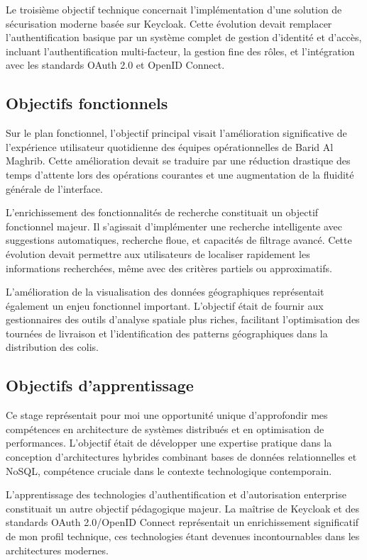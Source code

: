 Le troisième objectif technique concernait l'implémentation d'une solution de sécurisation moderne basée sur Keycloak. Cette évolution devait remplacer l'authentification basique par un système complet de gestion d'identité et d'accès, incluant l'authentification multi-facteur, la gestion fine des rôles, et l'intégration avec les standards OAuth 2.0 et OpenID Connect.

\subsection{Objectifs fonctionnels}

Sur le plan fonctionnel, l'objectif principal visait l'amélioration significative de l'expérience utilisateur quotidienne des équipes opérationnelles de Barid Al Maghrib. Cette amélioration devait se traduire par une réduction drastique des temps d'attente lors des opérations courantes et une augmentation de la fluidité générale de l'interface.

L'enrichissement des fonctionnalités de recherche constituait un objectif fonctionnel majeur. Il s'agissait d'implémenter une recherche intelligente avec suggestions automatiques, recherche floue, et capacités de filtrage avancé. Cette évolution devait permettre aux utilisateurs de localiser rapidement les informations recherchées, même avec des critères partiels ou approximatifs.

L'amélioration de la visualisation des données géographiques représentait également un enjeu fonctionnel important. L'objectif était de fournir aux gestionnaires des outils d'analyse spatiale plus riches, facilitant l'optimisation des tournées de livraison et l'identification des patterns géographiques dans la distribution des colis.

\subsection{Objectifs d'apprentissage}

Ce stage représentait pour moi une opportunité unique d'approfondir mes compétences en architecture de systèmes distribués et en optimisation de performances. L'objectif était de développer une expertise pratique dans la conception d'architectures hybrides combinant bases de données relationnelles et NoSQL, compétence cruciale dans le contexte technologique contemporain.

L'apprentissage des technologies d'authentification et d'autorisation enterprise constituait un autre objectif pédagogique majeur. La maîtrise de Keycloak et des standards OAuth 2.0/OpenID Connect représentait un enrichissement significatif de mon profil technique, ces technologies étant devenues incontournables dans les architectures modernes.

